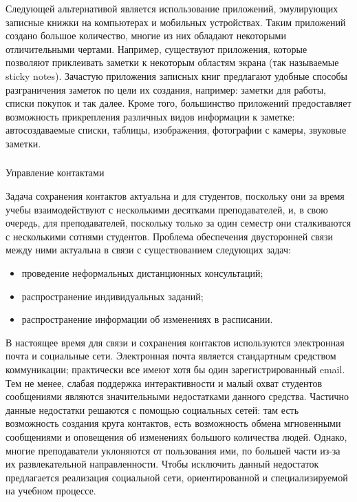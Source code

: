 Следующей альтернативой является использование приложений, эмулирующих записные книжки на компьютерах и мобильных устройствах. Таким приложений создано большое количество, многие из них обладают некоторыми отличительными чертами. Например, существуют приложения, которые позволяют приклеивать заметки к некоторым областям экрана (так называемые sticky notes). Зачастую приложения записных книг предлагают удобные способы разграничения заметок по цели их создания, например: заметки для работы, списки покупок и так далее. Кроме того, большинство приложений предоставляет возможность прикрепления различных видов информации к заметке: автосоздаваемые списки, таблицы, изображения, фотографии с камеры, звуковые заметки. 

\subsubsection{} Управление контактами
\label{sec:analysis:analogues:contacts}

Задача сохранения контактов актуальна и для студентов, поскольку они за время учебы взаимодействуют с несколькими десятками преподавателей, и, в свою очередь, для преподавателей, поскольку только за один семестр они сталкиваются с несколькими сотнями студентов. Проблема обеспечения двусторонней связи между ними актуальна в связи с существованием следующих задач:

\begin{itemize}
	\item проведение неформальных дистанционных консультаций;
	\item распространение индивидуальных заданий;
	\item распространение информации об изменениях в расписании.
\end{itemize}

В настоящее время для связи и сохранения контактов используются электронная почта и социальные сети. Электронная почта является стандартным средством коммуникации; практически все имеют хотя бы один зарегистрированный email. Тем не менее, слабая поддержка интерактивности и малый охват студентов сообщениями являются значительными недостатками данного средства. Частично данные недостатки решаются с помощью социальных сетей: там есть возможность создания круга контактов, есть возможность обмена мгновенными сообщениями и оповещения об изменениях большого количества людей. Однако, многие преподаватели уклоняются от пользования ими, по большей части из-за их развлекательной направленности. Чтобы исключить данный недостаток предлагается реализация социальной сети, ориентированной и специализируемой на учебном процессе.

